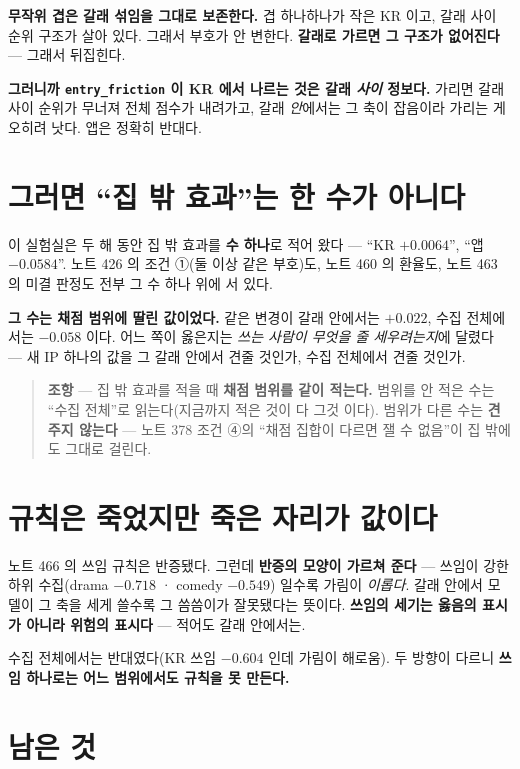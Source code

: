\documentclass[11pt]{article}
\begin{document}
\textbf{무작위 겹은 갈래 섞임을 그대로 보존한다.} 겹 하나하나가 작은
KR 이고, 갈래 사이 순위 구조가 살아 있다. 그래서 부호가 안 변한다.
\textbf{갈래로 가르면 그 구조가 없어진다} --- 그래서 뒤집힌다.

\textbf{그러니까 \texttt{entry\_friction} 이 KR 에서 나르는 것은 갈래
\emph{사이} 정보다.} 가리면 갈래 사이 순위가 무너져 전체 점수가 내려가고,
갈래 \emph{안}에서는 그 축이 잡음이라 가리는 게 오히려 낫다. 앱은 정확히
반대다.

\section{그러면 ``집 밖 효과''는 한 수가 아니다}

이 실험실은 두 해 동안 집 밖 효과를 \textbf{수 하나}로 적어 왔다 ---
``KR $+0.0064$'', ``앱 $-0.0584$''. 노트 426 의 조건 ①(둘 이상 같은
부호)도, 노트 460 의 환율도, 노트 463 의 미결 판정도 전부 그 수 하나
위에 서 있다.

\textbf{그 수는 채점 범위에 딸린 값이었다.} 같은 변경이 갈래 안에서는
$+0.022$, 수집 전체에서는 $-0.058$ 이다. 어느 쪽이 옳은지는 \emph{쓰는
사람이 무엇을 줄 세우려는지}에 달렸다 --- 새 IP 하나의 값을 그 갈래
안에서 견줄 것인가, 수집 전체에서 견줄 것인가.

\begin{quote}
\textbf{조항} --- 집 밖 효과를 적을 때 \textbf{채점 범위를 같이 적는다.}
범위를 안 적은 수는 ``수집 전체''로 읽는다(지금까지 적은 것이 다 그것
이다). 범위가 다른 수는 \textbf{견주지 않는다} --- 노트 378 조건 ④의
``채점 집합이 다르면 잴 수 없음''이 집 밖에도 그대로 걸린다.
\end{quote}

\section{규칙은 죽었지만 죽은 자리가 값이다}

노트 466 의 쓰임 규칙은 반증됐다. 그런데 \textbf{반증의 모양이
가르쳐 준다} --- 쓰임이 강한 하위 수집(drama $-0.718$ · comedy $-0.549$)
일수록 가림이 \emph{이롭다}. 갈래 안에서 모델이 그 축을 세게 쓸수록
그 씀씀이가 잘못됐다는 뜻이다. \textbf{쓰임의 세기는 옳음의 표시가
아니라 위험의 표시다} --- 적어도 갈래 안에서는.

수집 전체에서는 반대였다(KR 쓰임 $-0.604$ 인데 가림이 해로움). 두
방향이 다르니 \textbf{쓰임 하나로는 어느 범위에서도 규칙을 못 만든다.}

\section*{남은 것}
\end{document}
